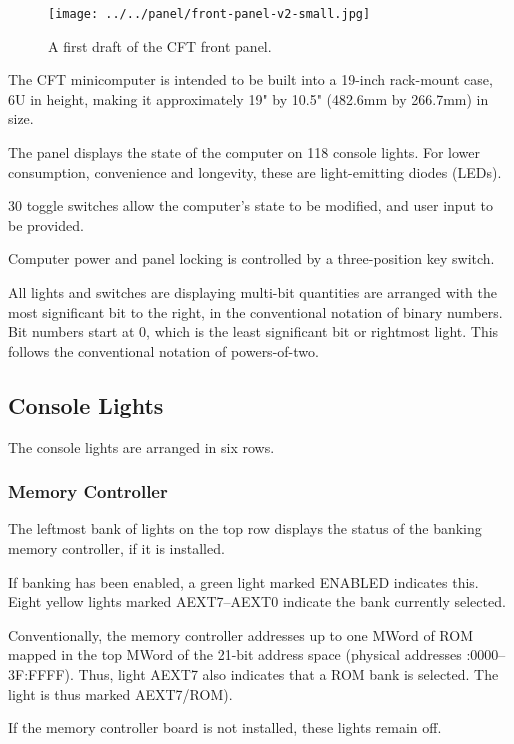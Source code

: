 \documentclass[11pt,a4paper,twocolumns]{article}
\newcommand{\lt}[1]{\textsf{#1}}
\begin{document}
\begin{figure}[t]
\centering
\texttt{[image: ../../panel/front-panel-v2-small.jpg]}\\
\caption{\label{fig-panel}A first draft of the CFT front panel.}
\end{figure}

The CFT minicomputer is intended to be built into a 19-inch rack-mount case, 6U
in height, making it approximately 19" by 10.5" (482.6mm by 266.7mm) in size.

The panel displays the state of the computer on 118 console lights. For lower
consumption, convenience and longevity, these are light-emitting diodes (LEDs).

30 toggle switches allow the computer's state to be modified, and user input to
be provided.

Computer power and panel locking is controlled by a three-position key switch.

All lights and switches are displaying multi-bit quantities are arranged with
the most significant bit to the right, in the conventional notation of binary
numbers. Bit numbers start at 0, which is the least significant bit or
rightmost light. This follows the conventional notation of powers-of-two.

\subsection{Console Lights}

The console lights are arranged in six rows.

\subsubsection{Memory Controller}

The leftmost bank of lights on the top row displays the status of the banking
memory controller, if it is installed.

If banking has been enabled, a green light marked \lt{ENABLED} indicates
this. Eight yellow lights marked \lt{AEXT7}–\lt{AEXT0} indicate the bank
currently selected.

Conventionally, the memory controller addresses up to one MWord of ROM mapped
in the top MWord of the 21-bit address space (physical addresses {:0000}–{\sf 3F:FFFF}). Thus, light \lt{AEXT7} also indicates that a ROM
bank is selected. The light is thus marked \lt{AEXT7/ROM}).

If the memory controller board is not installed, these lights remain off.
\end{document}
